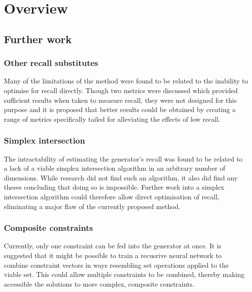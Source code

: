 \documentclass[../../main.tex]{subfiles}
\begin{document}
\chapter{Overview} \label{chapter:overview}

\section{Further work} \label{section:furtherWork}

\subsection{Other recall substitutes} \label{subsection:otherRecallSubstitutes}

Many of the limitations of the method were found to be related to the inability to optimise for recall directly.
Though two metrics were discussed which provided sufficient results when taken to measure recall, they were not designed for this purpose and it is proposed that better results could be obtained by creating a range of metrics specifically tailed for alleviating the effects of low recall.

\subsection{Simplex intersection} \label{subsection:simplexIntersection}

The intractability of estimating the generator's recall was found to be related to a lack of a viable simplex intersection algorithm in an arbitrary number of dimensions.
While research did not find such an algorithm, it also did find any theses concluding that doing so is impossible.
Further work into a simplex intersection algorithm could therefore allow direct optimisation of recall, eliminating a major flaw of the currently proposed method.

\subsection{Composite constraints} \label{subsection:compositeConstraints}

Currently, only one constraint can be fed into the generator at once.
It is suggested that it might be possible to train a recusrive neural network to combine constraint vectors in ways resembling set operations applied to the viable set.
This could allow multiple constraints to be combined, thereby making accessible the solutions to more complex, composite constraints.
\end{document}
